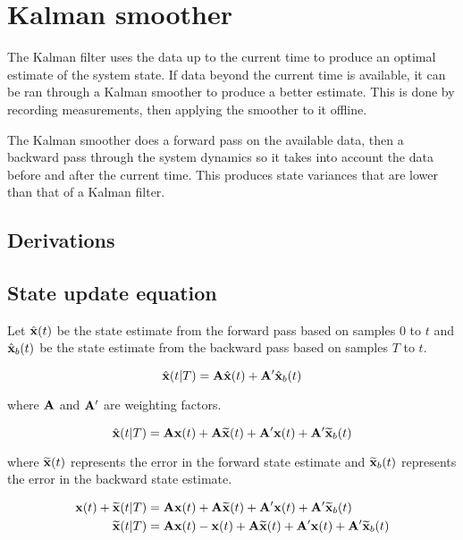 \section{Kalman smoother}

The Kalman filter uses the data up to the current time to produce an optimal
estimate of the system \gls{state}. If data beyond the current time is
available, it can be ran through a Kalman smoother to produce a better estimate.
This is done by recording measurements, then applying the smoother to it
offline.

The Kalman smoother does a forward pass on the available data, then a backward
pass through the system dynamics so it takes into account the data before and
after the current time. This produces \gls{state} variances that are lower than
that of a Kalman filter.

\subsection{Derivations}

\subsection{State update equation}

Let $\hat{\mathbf{x}}(t)$ be the state estimate from the forward pass based on
samples $0$ to $t$ and $\hat{\mathbf{x}}_b(t)$ be the state estimate from the
backward pass based on samples $T$ to $t$.

\begin{equation}
  \hat{\mathbf{x}}(t|T) = \mathbf{A}\hat{\mathbf{x}}(t) + \mathbf{A}'\hat{\mathbf{x}}_b(t)
    \label{eq:ks_xhat}
\end{equation}

where $\mathbf{A}$ and $\mathbf{A}'$ are weighting factors.

\begin{equation*}
  \hat{\mathbf{x}}(t|T) = \mathbf{A}\mathbf{x}(t) + \mathbf{A}\widetilde{\mathbf{x}}(t) +
    \mathbf{A}'\mathbf{x}(t) + \mathbf{A}'\widetilde{\mathbf{x}}_b(t)
\end{equation*}

where $\widetilde{\mathbf{x}}(t)$ represents the error in the forward state
estimate and $\widetilde{\mathbf{x}}_b(t)$ represents the error in the backward
state estimate.

\begin{align*}
  \mathbf{x}(t) + \widetilde{\mathbf{x}}(t|T) &= \mathbf{A}\mathbf{x}(t) +
    \mathbf{A}\widetilde{\mathbf{x}}(t) + \mathbf{A}'\mathbf{x}(t) +
    \mathbf{A}'\widetilde{\mathbf{x}}_b(t) \\
  \widetilde{\mathbf{x}}(t|T) &= \mathbf{A}\mathbf{x}(t) - \mathbf{x}(t) +
    \mathbf{A}\widetilde{\mathbf{x}}(t) + \mathbf{A}'\mathbf{x}(t) +
    \mathbf{A}'\widetilde{\mathbf{x}}_b(t)
\end{align*}

